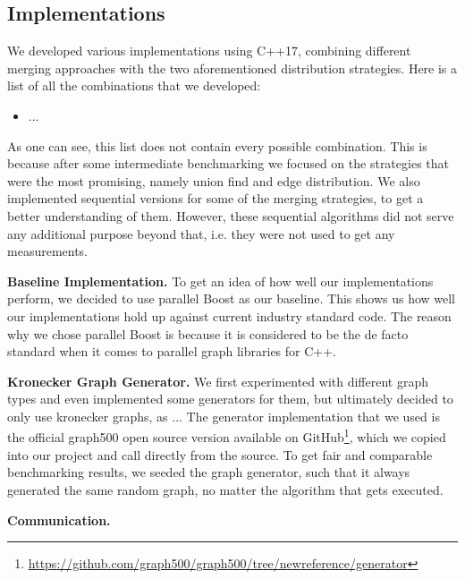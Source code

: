\documentclass[letterpaper]{article}
\newcommand{\mypar}[1]{{\bf #1.}}
\begin{document}
\subsection{Implementations}
We developed various implementations using C++17, combining different merging approaches with the two aforementioned
distribution strategies. Here is a list of all the combinations that we developed:
\begin{itemize}
  \item ... %
\end{itemize}
As one can see, this list does not contain every possible combination. This is because after some intermediate
benchmarking we focused on the strategies that were the most promising, namely union find and edge distribution.
We also implemented sequential versions for some of the merging strategies, to get a better understanding of them.
However, these sequential algorithms did not serve any additional purpose beyond that, i.e. they were not used to get
any measurements.

\mypar{Baseline Implementation}
To get an idea of how well our implementations perform, we decided to use parallel Boost as our baseline. This shows us
how well our implementations hold up against current industry standard code. The reason why we chose parallel Boost is
because it is considered to be the de facto standard when it comes to parallel graph libraries for C++.

\mypar{Kronecker Graph Generator}
We first experimented with different graph types and even implemented some generators for them, but ultimately decided
to only use kronecker graphs, as ... %
The generator implementation that we used is the official graph500 open source version available on
GitHub\footnote{\url{https://github.com/graph500/graph500/tree/newreference/generator}}, which we copied into our
project and call directly from the source. To get fair and comparable benchmarking results, we seeded the graph
generator, such that it always generated the same random graph, no matter the algorithm that gets executed.

\mypar{Communication}
\end{document}
